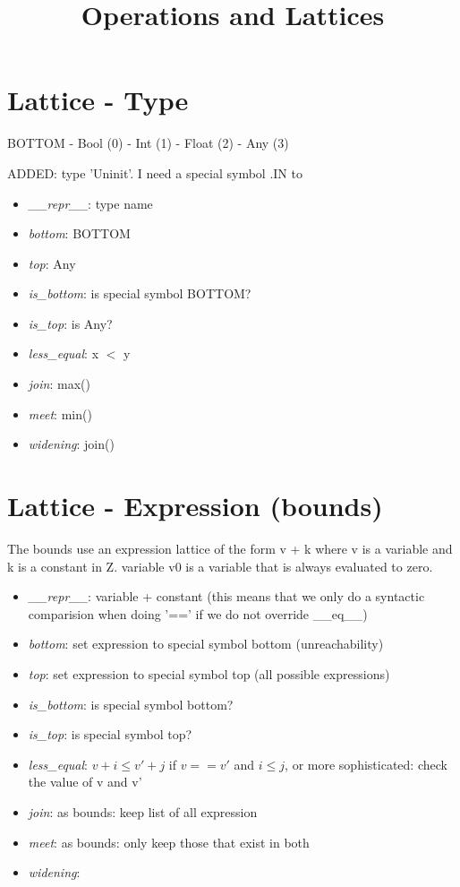 \documentclass[11pt]{article}
\begin{document}
\title{Operations and Lattices}

\maketitle


\section{Lattice - Type}

BOTTOM - Bool (0) - Int (1) - Float (2) - Any (3)

ADDED: type 'Uninit'. I need a special symbol .IN to 

\begin{itemize}
\item \textit{\_\_repr\_\_}: type name
\item \textit{bottom}: BOTTOM
\item \textit{top}: Any
\item \textit{is\_bottom}: is special symbol BOTTOM?
\item \textit{is\_top}: is Any?
\item \textit{less\_equal}: x $<$ y
\item \textit{join}: max()
\item \textit{meet}: min()
\item \textit{widening}: join()
\end{itemize}

\section{Lattice - Expression (bounds)}

The bounds use an expression lattice of the form v + k where v is a variable and k is a constant in Z. variable v0 is a variable that is always evaluated to zero.

\begin{itemize}
\item \textit{\_\_repr\_\_}: variable + constant (this means that we only do a syntactic comparision when doing '==' if we do not override \_\_eq\_\_)
\item \textit{bottom}: set expression to special symbol bottom (unreachability)
\item \textit{top}: set expression to special symbol top (all possible expressions)
\item \textit{is\_bottom}: is special symbol bottom?
\item \textit{is\_top}: is special symbol top?
\item \textit{less\_equal}: $v + i \leq v' + j$ if $v == v'$ and $i \leq j$, or more sophisticated: check the value of v and v'
\item \textit{join}: as bounds: keep list of all expression
\item \textit{meet}: as bounds: only keep those that exist in both
\item \textit{widening}: 
\end{itemize}
\end{document}
